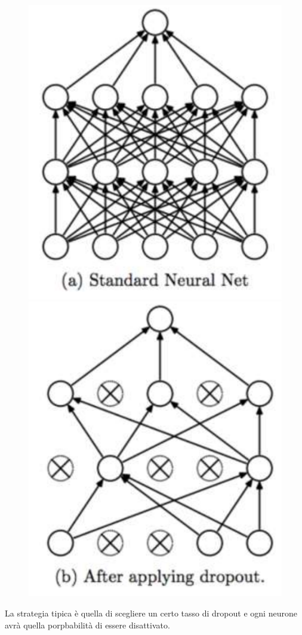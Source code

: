 \begin{figure}
	\vspace{-.7cm}
	\centering
	\includegraphics[width=.9\linewidth]{Picture/Dropout1}
	\includegraphics[width=.9\linewidth]{Picture/Dropout2}
\end{figure}
La strategia tipica è quella di scegliere un certo tasso di dropout e ogni neurone avrà quella porpbabilità di essere disattivato.

